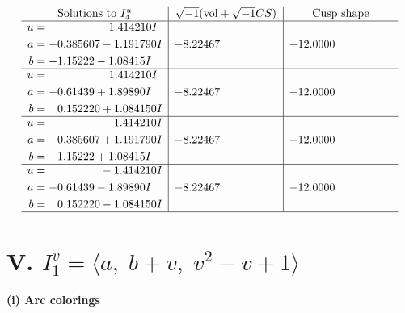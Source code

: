 \documentclass[1p]{elsarticle_modified}
\theoremstyle{definition}
\newcommand{\I}{\sqrt{-1}}
\begin{document}
$$\begin{array}{c|c|c}  
\text{Solutions to }I^u_{4}& \I (\text{vol} + \sqrt{-1}CS) & \text{Cusp shape}\\
 \hline 
\begin{aligned}
u &= \phantom{-0.000000 -}1.414210 I \\
a &= -0.385607 - 1.191790 I \\
b &= -1.15222 - 1.08415 I\end{aligned}
 & -8.22467\phantom{ +0.000000I} & -12.0000\phantom{ +0.000000I} \\ \hline\begin{aligned}
u &= \phantom{-0.000000 -}1.414210 I \\
a &= -0.61439 + 1.89890 I \\
b &= \phantom{-}0.152220 + 1.084150 I\end{aligned}
 & -8.22467\phantom{ +0.000000I} & -12.0000\phantom{ +0.000000I} \\ \hline\begin{aligned}
u &= \phantom{-0.000000 } -1.414210 I \\
a &= -0.385607 + 1.191790 I \\
b &= -1.15222 + 1.08415 I\end{aligned}
 & -8.22467\phantom{ +0.000000I} & -12.0000\phantom{ +0.000000I} \\ \hline\begin{aligned}
u &= \phantom{-0.000000 } -1.414210 I \\
a &= -0.61439 - 1.89890 I \\
b &= \phantom{-}0.152220 - 1.084150 I\end{aligned}
 & -8.22467\phantom{ +0.000000I} & -12.0000\phantom{ +0.000000I}\\
 \hline 
 \end{array}$$\newpage\newpage\renewcommand{\arraystretch}{1}
\centering \section*{V. $I^v_{1}= \langle a,\;b+v,\;v^2- v+1 \rangle$}
\flushleft \textbf{(i) Arc colorings}\\
\end{document}
